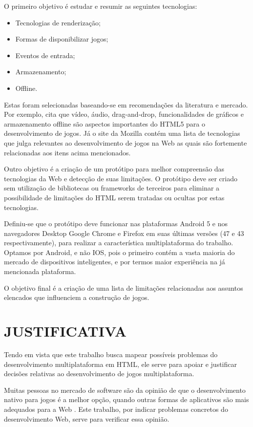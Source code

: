 O primeiro objetivo é estudar e resumir as seguintes tecnologias:

\begin{itemize}
\item Tecnologias de renderização;
\item Formas de disponibilizar jogos;
\item Eventos de entrada;
\item Armazenamento;
\item Offline.
\end{itemize}

Estas foram selecionadas baseando-se em recomendações da literatura
e mercado. Por exemplo, \citet{browserGamesTechnologyAndFuture} cita
que vídeo, áudio, drag-and-drop, funcionalidades de gráficos e
armazenamento offline são aspectos importantes do HTML5 para o
desenvolvimento de jogos. Já o site da Mozilla \citet{gamesIntroduction}
contém uma lista de tecnologias que julga relevantes ao desenvolvimento
de jogos na Web as quais são fortemente relacionadas aos itens acima
mencionados.

Outro objetivo é a criação de um protótipo para melhor compreensão
das tecnologias da Web e detecção de suas limitações. O protótipo
deve ser criado sem utilização de bibliotecas ou frameworks de
terceiros para eliminar a possibilidade de limitações do HTML serem
tratadas ou ocultas por estas tecnologias.

Definiu-se que o protótipo deve funcionar nas plataformas Android
5 e nos navegadores Desktop Google Chrome e Firefox em suas últimas
versões (47 e 43 respectivamente), para realizar a característica
multiplataforma do trabalho. Optamos por Android, e não IOS, pois
o primeiro contém a vasta maioria do mercado de dispositivos
inteligentes, e por termos maior experiência na já mencionada
plataforma.

O objetivo final é a criação de uma lista de limitações relacionadas
aos assuntos elencados que influenciem a construção de jogos.

\section{JUSTIFICATIVA}

Tendo em vista que este trabalho busca mapear possíveis problemas
do desenvolvimento multiplataforma em HTML, ele serve para apoiar
e justificar decisões relativas ao desenvolvimento de jogos
multiplataforma.

Muitas pessoas no mercado de software são da opinião de que o
desenvolvimento nativo para jogos é a melhor opção, quando outras
formas de aplicativos são mais adequados para a Web \citet[p.
21]{aSeriousContender}. Este trabalho, por indicar problemas concretos
do desenvolvimento Web, serve para verificar essa opinião.

